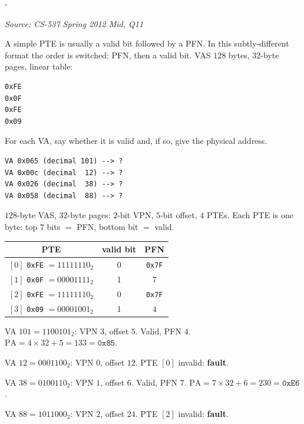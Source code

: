 \documentclass[11pt,a4paper]{article}
\makeatletter
\newcommand{\keepspace}[1]{\par\penalty-100\begingroup
  \setlength{\dimen@}{#1}\dimen@ii\pagegoal\advance\dimen@ii-\pagetotal
  \ifdim\dimen@>\dimen@ii\ifdim\dimen@ii>\z@\vfil\fi\break\fi\endgroup}
\newcounter{qn}[section]
\newenvironment{Qn}[4]{%
  \refstepcounter{qn}\keepspace{7\baselineskip}%
  \begin{tcolorbox}[qboxstyle, title={Q\thesection.\theqn\ \ [#1 \textbar\ #2]\ \ #4}]%
  {\footnotesize\color{g3}\textit{Source: #3}}\par\smallskip%
}{%
  \end{tcolorbox}%
}
\newenvironment{Sol}{%
  \begin{tcolorbox}[sboxstyle, title={Solution}]%
}{%
  \end{tcolorbox}\vspace{0.35em}%
}
\makeatother
\begin{document}
\begin{Qn}{Medium-Hard}{Lect 12}{CS-537 Spring 2012 Mid, Q11}{The valid bit moved to the low end of the PTE}
A simple PTE is usually a valid bit followed by a PFN. In this
subtly-different format the order is switched: PFN, then a valid bit.
VAS $128$ bytes, $32$-byte pages, linear table:
\begin{lstlisting}[numbers=none]
0xFE
0x0F
0xFE
0x09
\end{lstlisting}
For each VA, say whether it is valid and, if so, give the physical
address.
\begin{lstlisting}[numbers=none]
VA 0x065 (decimal 101) --> ?
VA 0x00c (decimal  12) --> ?
VA 0x026 (decimal  38) --> ?
VA 0x058 (decimal  88) --> ?
\end{lstlisting}
\end{Qn}
\begin{Sol}
$128$-byte VAS, $32$-byte pages: $2$-bit VPN, $5$-bit offset, $4$
PTEs. Each PTE is one byte: top $7$ bits $=$ PFN, bottom bit $=$
valid.

\begin{center}
\begin{tabular}{c|c|c}
PTE & valid bit & PFN \\
\hline
$[0]$ \texttt{0xFE} $=11111110_2$ & 0 & \texttt{0x7F} \\
$[1]$ \texttt{0x0F} $=00001111_2$ & 1 & $7$ \\
$[2]$ \texttt{0xFE} $=11111110_2$ & 0 & \texttt{0x7F} \\
$[3]$ \texttt{0x09} $=00001001_2$ & 1 & $4$ \\
\end{tabular}
\end{center}

VA $101=1100101_2$: VPN $3$, offset $5$. Valid, PFN $4$.
$\mathrm{PA}=4\times 32+5=133=\texttt{0x85}$.

VA $12=0001100_2$: VPN $0$, offset $12$. PTE $[0]$ invalid:
\textbf{fault}.

VA $38=0100110_2$: VPN $1$, offset $6$. Valid, PFN $7$.
$\mathrm{PA}=7\times 32+6=230=\texttt{0xE6}$.

VA $88=1011000_2$: VPN $2$, offset $24$. PTE $[2]$ invalid:
\textbf{fault}.
\end{Sol}
\end{document}
